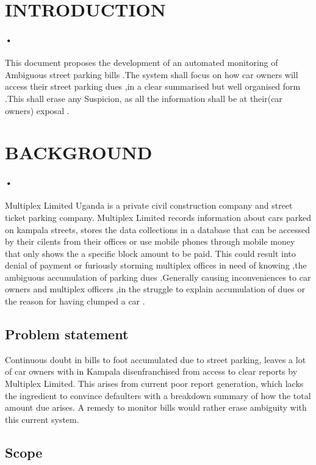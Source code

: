 \documentclass[12pt]{article}
\begin{document}
\section{INTRODUCTION}
\paragraph{•}
This document proposes the development of an automated monitoring of Ambiguous street parking bills .The system shall focus on how car owners will access their street parking dues ,in a clear summarised but well organised form .This shall erase any Suspicion, as all the information shall be at their(car owners) exposal .
  
\section{BACKGROUND}
\paragraph{•}
Multiplex Limited Uganda is a private civil construction company and street ticket parking company. Multiplex Limited records information about cars parked on kampala streets, stores the data collections in a database that can be accessed by their cilents from their offices or use mobile phones through mobile money that only shows the a specific block amount to be paid. This could result into denial of payment or furiously storming multiplex offices in need of knowing ,the ambiguous accumulation of parking dues .Generally causing inconveniences to car owners and multiplex officers ,in the struggle to explain accumulation of dues or the reason for having clumped a car .

\subsection{Problem statement} 
Continuous doubt in bills to foot accumulated due to street parking, leaves a lot of car owners with in Kampala disenfranchised from access to clear reports by Multiplex Limited. This arises from current poor report generation, which lacks the ingredient to convince defaulters with a breakdown summary of how the total amount due arises. A remedy to monitor bills would rather erase ambiguity with this current system.

\subsection{Scope}
\end{document}
